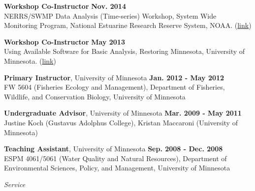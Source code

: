 \documentclass[letterpaper,12pt]{article}
\newcommand{\sectitle}[1]{\vspace{\baselineskip} \centerline{\large{\textit{#1}}}}
\begin{document}
{\bf Workshop Co-Instructor} \hfill {\bf Nov. 2014}\\
NERRS/SWMP Data Analysis (Time-series) Workshop, System Wide Monitoring Program, National Estuarine Research Reserve System, NOAA. (\href{http://copepod.org/nerrs-swmp-workshop/}{link})

{\bf Workshop Co-Instructor} \hfill {\bf May 2013} \\
Using Available Software for Basic Analysis, Restoring Minnesota, University of Minnesota. (\href{http://cceevents.umn.edu/restoring-minnesota/workshop}{link})

{\bf Primary Instructor}, University of Minnesota \hfill {\bf Jan. 2012 - May 2012} \\
FW 5604 (Fisheries Ecology and Management), Department of Fisheries, Wildlife, and Conservation Biology, University of Minnesota

{\bf Undergraduate Advisor}, University of Minnesota \hfill {\bf Mar. 2009 - May 2011} \\
Justine Koch (Gustavus Adolphus College), Kristan Maccaroni (University of Minnesota)

{\bf Teaching Assistant}, University of Minnesota \hfill {\bf Sep. 2008 - Dec. 2008} \\
ESPM 4061/5061 (Water Quality and Natural Resources), Department of Environmental Sciences, Policy, and Management, University of Minnesota

\sectitle{Service}
\end{document}
